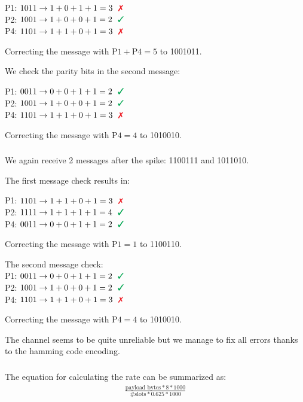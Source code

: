 \documentclass[12pt]{article}
\newcommand{\multipartexercise}{\addtocounter{subsection}{1}\setcounter{subsubsection}{0}}
\newcommand{\exercisepart}{\subsubsection{}}
\begin{document}
\noindent
P1: $1011 \rightarrow 1+0+1+1=3 \ \color{Red} \ \text{\ding{55}}$ \\
P2: $1001 \rightarrow 1+0+0+1=2 \ \color{Green} \ \text{\ding{51}}$ \\
P4: $1101 \rightarrow 1+1+0+1=3 \ \color{Red} \ \text{\ding{55}}$

\noindent
Correcting the message with $\text{P1} + \text{P4} = 5$ to 1001011.

\bigskip
\noindent
We check the parity bits in the second message:

\noindent
P1: $0011 \rightarrow 0+0+1+1=2 \ \color{Green} \ \text{\ding{51}}$ \\
P2: $1001 \rightarrow 1+0+0+1=2 \ \color{Green} \ \text{\ding{51}}$ \\
P4: $1101 \rightarrow 1+1+0+1=3 \ \color{Red} \ \text{\ding{55}}$

\noindent
Correcting the message with $\text{P4} = 4$ to 1010010.

\exercisepart
We again receive 2 messages after the spike: 1100111 and 1011010.

\bigskip
\noindent
The first message check results in:

\noindent
P1: $1101 \rightarrow 1+1+0+1=3 \ \color{Red} \ \text{\ding{55}}$ \\
P2: $1111 \rightarrow 1+1+1+1=4 \ \color{Green} \ \text{\ding{51}}$ \\
P4: $0011 \rightarrow 0+0+1+1=2 \ \color{Green} \ \text{\ding{51}}$

\noindent
Correcting the message with $\text{P1} = 1$ to 1100110.

\bigskip
\noindent
The second message check:
\\
P1: $0011 \rightarrow 0+0+1+1=2 \ \color{Green} \ \text{\ding{51}}$ \\
P2: $1001 \rightarrow 1+0+0+1=2 \ \color{Green} \ \text{\ding{51}}$ \\
P4: $1101 \rightarrow 1+1+0+1=3 \ \color{Red} \ \text{\ding{55}}$

\noindent
Correcting the message with $\text{P4} = 4$ to 1010010.

\bigskip

The channel seems to be quite unreliable but we manage to fix all errors thanks to the hamming code encoding.

\multipartexercise
\exercisepart
The equation for calculating the rate can be summarized as:
\begin{align*}
  \frac{\text{payload bytes}*8*1000}{\text{\# slots}*0.625*1000}
\end{align*}
\end{document}
